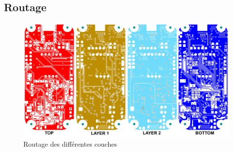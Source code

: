 \subsection{Routage} \label{ssec:routage}

\begin{figure}[h]
	\centering
	\includegraphics[width=1\linewidth]{../figures/dev-pcb/Couches-layout}
	\caption{Routage des différentes couches}
	\label{fig:couches-layout}
\end{figure}


